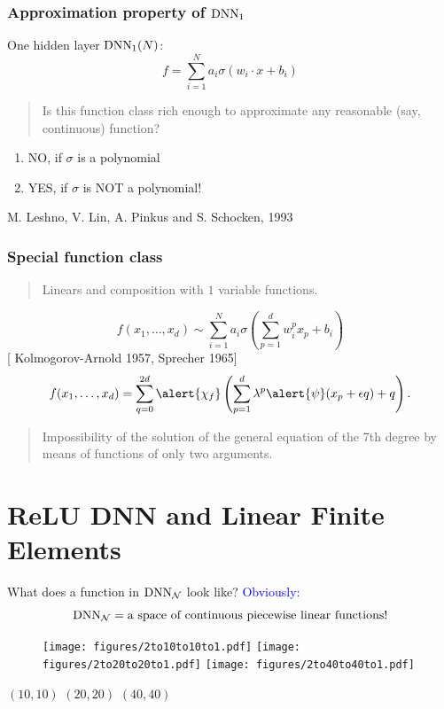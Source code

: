 \documentclass{beamer}
\newcommand{\blue}[1]{\textcolor{blue}{#1}}
\begin{document}
\begin{CJK*}{UTF8}{gbsn}
\begin{frame}
\frametitle{Approximation property of ${\rm DNN}_1$}
\small
One hidden layer ${\rm DNN}_1(N)$:
$$
f=\sum_{i=1}^N a_i\sigma(w_i\cdot x+b_i)
$$
\pause 
{}
\begin{quote}
Is this function class rich enough to approximate any reasonable
(say, continuous) function?
\end{quote}
\pause 
{}
\begin{enumerate}
\item  NO, if $\sigma$ is a polynomial 
\pause
\item  YES, if $\sigma$ is NOT a polynomial!
\end{enumerate}
\pause
\vfill
{\tiny M. Leshno, V. Lin, A. Pinkus and S. Schocken, 1993}
\end{frame}

\begin{frame}
  \frametitle{Special function class}
  \begin{quote}
Linears and composition with $1$  variable functions.
  \end{quote}
\pause
{}
$$
f(x_1,\ldots,x_d)\sim \sum_{i=1}^N a_i\sigma\left(\sum_{p=1}^dw_i^px_p+b_i\right)
$$
\pause
{} [{\tiny
  Kolmogorov-Arnold 1957, Sprecher 1965}]
$$
f(x_1,\ldots,x_d)=\sum_{q=0}^{2d}\alert{\chi_f}\left(\sum_{p=1}^d\lambda^p\alert{\psi}(x_p+\epsilon
  q)+q\right).
$$
\pause
{}
\begin{quote}\tiny 
	Impossibility of the solution of the general equation of the 7th degree by means of functions of only two arguments.
\end{quote}
\end{frame}

\section{ReLU DNN and Linear Finite Elements}
\begin{frame} 
{What does a function in ${\rm DNN}_{\mathcal N}$ look like?}
\blue{Obviously:}
$$
{\rm DNN}_{\mathcal N}=\mbox{\rm a space of continuous piecewise linear functions!}
$$
\vskip-40pt 
\pause
\begin{figure}
	\begin{center}
		\texttt{[image: figures/2to10to10to1.pdf]}  
		\texttt{[image: figures/2to20to20to1.pdf]}  
		\texttt{[image: figures/2to40to40to1.pdf]}  
	\end{center} 
\end{figure}
\vspace{-20mm}
\begin{center}
	$(10, 10)$ \qquad\qquad\qquad  $(20, 20)$ \qquad\qquad \qquad $ (40,40)$  
\end{center}
\end{frame}


\end{CJK*}
\end{document}
